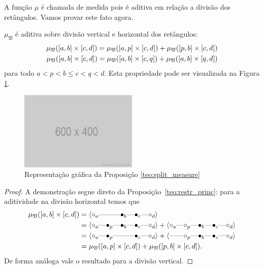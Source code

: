 A função $\mu$ é chamada de medida pois é aditiva em relação a divisão dos retângulos. 
Vamos provar este fato agora.

\begin{propo}\label{teo:split_measure}
    $\mu_{\mathfrak{V}}$ é aditiva sobre divisão vertical e horizontal dos retângulos:
    \begin{align*}
        \mu_{\mathfrak{V}}([a,b]\times[c,d]) = \mu_{\mathfrak{V}}([a,p]\times[c,d]) 
        + \mu_{\mathfrak{V}}([p,b] \times [c,d]) \\
        \mu_{\mathfrak{V}}([a,b]\times[c,d]) = \mu_{\mathfrak{V}}([a,b]\times[c,q]) 
        + \mu_{\mathfrak{V}}([a,b] \times [q,d])
    \end{align*}
    para todo $a < p < b \leq c < q < d$. Esta propriedade pode ser visualizada na Figura 
    \ref{fig:split_measure}.
    \begin{figure}[htpb!]
        \centering
        \includegraphics[width=0.5\textwidth]{images/placeholder.png}
        \caption{Representação gráfica da Proposição \ref{teo:split_measure}}
        \label{fig:split_measure}
        \fautor
    \end{figure}
\end{propo}
\begin{proof}
    A demonstração segue direto da Proposição~\ref{teo:restr_princ}: para a aditividade na divisão
    horizontal temos que
    \begin{align*}
        \mu_{\frakv}([a,b] \times [c,d]) & = \innerproduct{\qoff{a} \qem \qno \qem \qon{b} \qem \qon{c} \qem \qoff{d}} \\
        &=\innerproduct{\qoff{a} \qem \qon{p} \qem \qon{b} \qem \qon{c} \qem \qoff{d}}
          + \innerproduct{\qoff{a} \qem \qoff{p} \qem \qon{b} \qem \qon{c} \qem \qoff{d}} \\
        &=\innerproduct{\qoff{a} \qem \qon{p} \qem \qno \qem \qon{c} \qem \qoff{d}}
          + \innerproduct{\qno \qem \qoff{p} \qem \qon{b} \qem \qon{c} \qem \qoff{d}} \\
        &=\mu_{\frakv}([a,p] \times [c,d]) + \mu_{\frakv}([p,b] \times [c,d]).
    \end{align*}
    De forma análoga vale o resultado para a divisão vertical.  
\end{proof}

